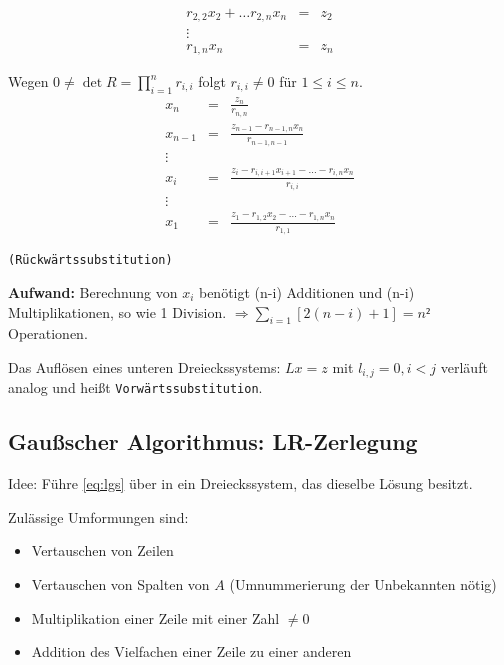 \documentclass[a4paper,10pt]{scrartcl}
\newtheorem[L]{satz}{Satz}[section]
\newtheorem[S]{beweis}{Beweis}
\newtheorem[S]{beh}{Behauptung}
\begin{document}
\smallskip
 \begin{eqnarray*} %
  r_{2,2}x_2+ \ldots r_{2,n}x_n &=& z_2\\
  \vdots\\
  r_{1,n}x_n &=& z_n
 \end{eqnarray*}

Wegen $0 \neq \det{R} = \prod \limits_{i = 1}^n r_{i,i} $ folgt $ r_{i,i} \neq 0$ für $ 1 \leq i \leq n$.
\begin{eqnarray*}
  x_n &=& \frac{z_n}{r_{n,n}}\\
  x_{n-1} &=& \frac{  z_{n-1} - r_{n-1, n} x_n  }{  r_{n-1,n-1}  }\\
  \vdots\\
  x_{i} &=& \frac{z_{i} - r_{i, i+1} x_{i+1} - \ldots - r_{i, n} x_n}{r_{i,i}}\\
  \vdots\\
  x_{1} &=& \frac{z_{1} - r_{1, 2} x_{2} - \ldots - r_{1, n} x_n}{r_{1,1}}
\end{eqnarray*}

\texttt{(Rückwärtssubstitution)}\\

\smallskip

\textbf{Aufwand:} Berechnung von $x_i$ benötigt (n-i) Additionen und (n-i) Multiplikationen, so wie 1 Division.
$\Rightarrow \sum\limits_{i=1} {[2(n-i)+1 ]} = n²$ Operationen.\\

\smallskip

Das Auflösen eines unteren Dreieckssystems: $Lx = z$ mit $l_{i,j}= 0  , i< j$
verläuft analog und heißt \texttt{Vorwärtssubstitution}.

\subsection{Gaußscher Algorithmus: LR-Zerlegung}

Idee: Führe \eqref{eq:lgs} über in ein Dreieckssystem, das dieselbe Lösung besitzt.

Zulässige Umformungen sind:
\begin{itemize}
  \item Vertauschen von Zeilen
  \item Vertauschen von Spalten von $A$ (Umnummerierung der Unbekannten nötig)
  \item Multiplikation einer Zeile mit einer Zahl $\neq 0$
  \item Addition des Vielfachen einer Zeile zu einer anderen
\end{itemize}
\end{document}

